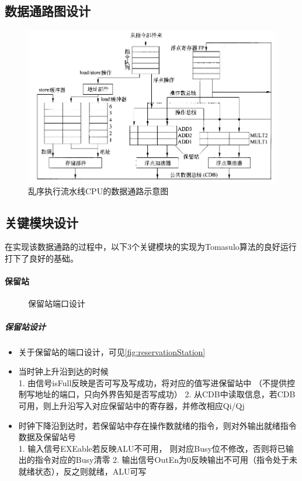 \documentclass[twoside]{article}
\begin{document}
\subsection{数据通路图设计}
\begin{figure}[htp]
    \centering
    \includegraphics[width=13cm]{"./figure/dataPathDiagram.png"}       
    \caption{乱序执行流水线CPU的数据通路示意图}
    \label{fig:dataPathDiagram}
\end{figure}

\subsection{关键模块设计}
在实现该数据通路的过程中，以下3个关键模块的实现为Tomasulo算法的良好运行打下了良好的基础。
\paragraph{保留站}

\begin{figure}[htp]
    \centering
    \makebox[\textwidth]{\framebox[5cm]{\rule{0pt}{5cm}}}
    \caption{保留站端口设计}
    \label{fig:reservationStation}
\end{figure}

\subparagraph{保留站设计}
\begin{itemize}
    \item 关于保留站的端口设计，可见\autoref{fig:reservationStation}
    \item 当时钟上升沿到达的时候 \\
        1. 由信号isFull反映是否可写及写成功，将对应的值写进保留站中
        （不提供控制写地址的端口，只向外界告知是否写成功）
        2. 从CDB中读取信息，若CDB可用，则上升沿写入对应保留站中的寄存器，并修改相应Qi/Qj
    \item 时钟下降沿到达时，若保留站中存在操作数就绪的指令，则对外输出就绪指令数据及保留站号 \\
        1. 输入信号EXEable若反映ALU不可用， 则对应Busy位不修改，否则将已输出的指令对应的Busy清零
        2. 输出信号OutEn为0反映输出不可用（指令处于未就绪状态），反之则就绪，ALU可写 
\end{itemize}   
\end{document}
